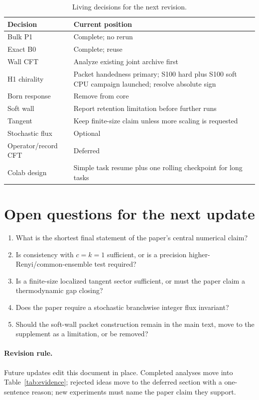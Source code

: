 \documentclass[aps,prx,twocolumn,floatfix,nofootinbib,superscriptaddress]{revtex4-2}
\begin{document}
\begin{table}[b]
\caption{Living decisions for the next revision.}
\label{tab:decisions}
\footnotesize
\renewcommand{\arraystretch}{1.12}
\begin{tabularx}{\columnwidth}{@{}p{}Y@{}}
\toprule
Decision & Current position \\
\midrule
Bulk P1 & Complete; no rerun \\
Exact B0 & Complete; reuse \\
Wall CFT & Analyze existing joint archive first \\
H1 chirality & Packet handedness primary; S100 hard plus S100 soft CPU campaign launched; resolve absolute sign \\
Born response & Remove from core \\
Soft wall & Report retention limitation before further runs \\
Tangent & Keep finite-size claim unless more scaling is requested \\
Stochastic flux & Optional \\
Operator/record CFT & Deferred \\
Colab design & Simple task resume plus one rolling checkpoint for long tasks \\
\bottomrule
\end{tabularx}
\end{table}

\section{Open questions for the next update}

\begin{enumerate}
\item What is the shortest final statement of the paper's central numerical
claim?
\item Is consistency with $c=k=1$ sufficient, or is a precision
higher-Renyi/common-ensemble test required?
\item Is a finite-size localized tangent sector sufficient, or must the paper
claim a thermodynamic gap closing?
\item Does the paper require a stochastic branchwise integer flux invariant?
\item Should the soft-wall packet construction remain in the main text, move
to the supplement as a limitation, or be removed?
\end{enumerate}

\paragraph*{Revision rule.}
Future updates edit this document in place.  Completed analyses move into
Table~\ref{tab:evidence}; rejected ideas move to the deferred section with a
one-sentence reason; new experiments must name the paper claim they support.
\end{document}
